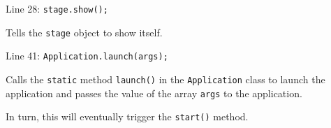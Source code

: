 \documentclass{beamer}
\newcommand{\mil}[1]{\texttt{#1}}
\begin{document}
\begin{frame}[fragile]

    Line 28:  \mil{stage.show();}
    
    \bigskip
    
    Tells the \mil{stage} object to show itself.
    
\end{frame}

\begin{frame}[fragile]
    
    Line 41:  \mil{Application.launch(args);}
    
    \bigskip
    
    Calls the \mil{static} method \mil{launch()} in the \mil{Application} class to launch the application and passes the value of the array \mil{args} to the application.
    
    \bigskip
    
    In turn, this will eventually trigger the \mil{start()} method.

\end{frame}
\end{document}
